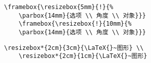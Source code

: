 \hspace{-1.5cm}\begin{minipage}[b]{.5\textwidth}
	\begin{center}
		\par\vspace{0pt}
	\end{center}
\end{minipage}%
\hspace{-1cm}\begin{minipage}[b]{.5\textwidth}
	\begin{Verbatim}[formatcom=\color{VerbatimColor}\CJKfamily{kai}]
	\framebox{\resizebox{5mm}{!}{%
	\parbox{14mm}{选项 \\ 角度 \\ 对象}}}
	\framebox{\resizebox{!}{10mm}{%
	\parbox{14mm}{选项 \\ 角度 \\ 对象}}}
	\end{Verbatim}
	\par\vspace{0pt}
\end{minipage}

\hspace{-2cm}\begin{minipage}[b]{.5\textwidth}
	\begin{center}
		\par\vspace{0pt}
	\end{center}
\end{minipage}%
\begin{minipage}[b]{.5\textwidth}
	\begin{Verbatim}[formatcom=\color{VerbatimColor}\CJKfamily{kai}]
	\resizebox*{2cm}{3cm}{\LaTeX{}~图形} \\
	\resizebox*{2cm}{1cm}{\LaTeX{}~图形}
	\end{Verbatim}
	\par\vspace{0pt}
\end{minipage}

